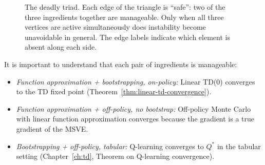 \begin{figure}[ht]
\centering
{}
\caption{The deadly triad.  Each edge of the triangle is ``safe'': two of the three ingredients
together are manageable.  Only when all three vertices are active simultaneously does instability
become unavoidable in general.  The edge labels indicate which element is absent along each side.}
\label{fig:deadly-triad}
\end{figure}

It is important to understand that each pair of ingredients is manageable:
\begin{itemize}[leftmargin=*]
\item \emph{Function approximation + bootstrapping, on-policy:} Linear TD(0) converges to the TD
  fixed point (Theorem~\ref{thm:linear-td-convergence}).
\item \emph{Function approximation + off-policy, no bootstrap:} Off-policy Monte Carlo with linear
  function approximation converges because the gradient is a true gradient of the MSVE.
\item \emph{Bootstrapping + off-policy, tabular:} Q-learning converges to $Q^*$ in the tabular
  setting (Chapter~\ref{ch:td}, Theorem on Q-learning convergence).
\end{itemize}

